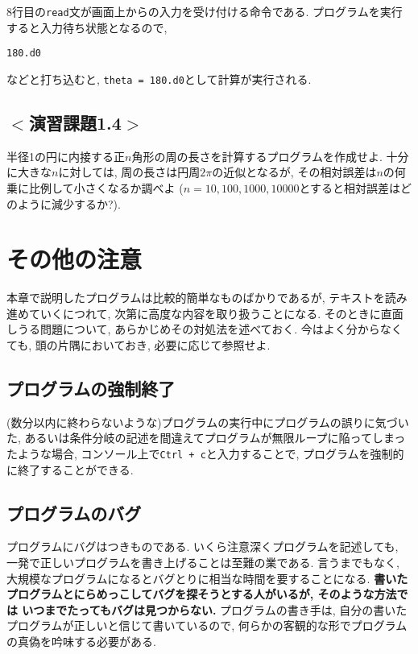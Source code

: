 8行目の\verb|read|文が画面上からの入力を受け付ける命令である. 
プログラムを実行すると入力待ち状態となるので, 
\begin{Verbatim}[frame=single]
180.d0
\end{Verbatim}
などと打ち込むと, \verb|theta = 180.d0|として計算が実行される. 


\subsection*{$<$演習課題1.4$>$}
半径1の円に内接する正$n$角形の周の長さを計算するプログラムを作成せよ. 
十分に大きな$n$に対しては, 周の長さは円周$2\pi$の近似となるが, 
その相対誤差は$n$の何乗に比例して小さくなるか調べよ
($n=10, 100, 1000, 10000$とすると相対誤差はどのように減少するか?). 


\section{その他の注意}
本章で説明したプログラムは比較的簡単なものばかりであるが, 
テキストを読み進めていくにつれて, 次第に高度な内容を取り扱うことになる. 
そのときに直面しうる問題について, あらかじめその対処法を述べておく. 
今はよく分からなくても, 頭の片隅においておき, 必要に応じて参照せよ. 

\subsection{プログラムの強制終了}
(数分以内に終わらないような)プログラムの実行中にプログラムの誤りに気づいた, 
あるいは条件分岐の記述を間違えてプログラムが無限ループに陥ってしまったような場合, 
コンソール上で\verb|Ctrl + c|と入力することで, 
プログラムを強制的に終了することができる. 

\subsection{プログラムのバグ}
プログラムにバグはつきものである. 
いくら注意深くプログラムを記述しても, 一発で正しいプログラムを書き上げることは至難の業である. 
言うまでもなく, 大規模なプログラムになるとバグとりに相当な時間を要することになる. 
\textbf{書いたプログラムとにらめっこしてバグを探そうとする人がいるが, そのような方法では
いつまでたってもバグは見つからない.} 
プログラムの書き手は, 自分の書いたプログラムが正しいと信じて書いているので, 
何らかの客観的な形でプログラムの真偽を吟味する必要がある. \\

